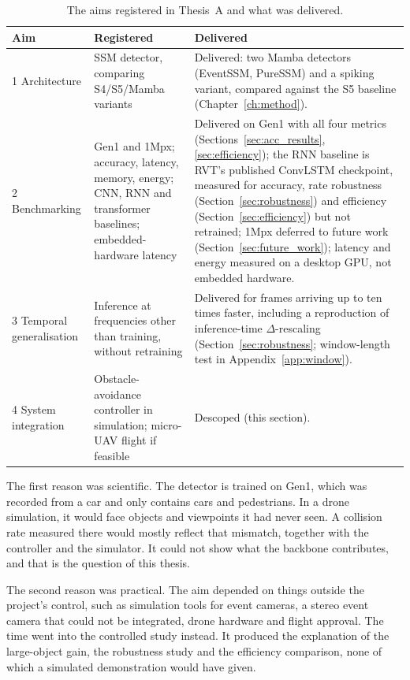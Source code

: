 \documentclass[11pt, a4paper]{report}
\begin{document}
\begin{table}[htbp]
\centering
\small
\caption[Thesis A aims against what was delivered]{The aims registered in Thesis~A and what was delivered.}
\label{tab:aims}
\begin{tabularx}{\textwidth}{@{}l>{\raggedright\arraybackslash}X>{\raggedright\arraybackslash}X@{}}
\toprule
\textbf{Aim} & \textbf{Registered} & \textbf{Delivered} \\
\midrule
1 Architecture & SSM detector, comparing S4/S5/Mamba variants &
  Delivered: two Mamba detectors (EventSSM, PureSSM) and a spiking variant, compared against the S5
  baseline (Chapter~\ref{ch:method}). \\
2 Benchmarking & Gen1 and 1Mpx; accuracy, latency, memory, energy; CNN, RNN and transformer baselines;
  embedded-hardware latency &
  Delivered on Gen1 with all four metrics (Sections~\ref{sec:acc_results}, \ref{sec:efficiency}); the
  RNN baseline is RVT's published ConvLSTM checkpoint, measured for accuracy, rate robustness
  (Section~\ref{sec:robustness}) and efficiency (Section~\ref{sec:efficiency}) but not retrained;
  1Mpx deferred to future work (Section~\ref{sec:future_work}); latency and energy measured on a
  desktop GPU, not embedded hardware. \\
3 Temporal generalisation & Inference at frequencies other than training, without retraining &
  Delivered for frames arriving up to ten times faster, including a reproduction of inference-time
  $\Delta$-rescaling (Section~\ref{sec:robustness}; window-length test in Appendix~\ref{app:window}). \\
4 System integration & Obstacle-avoidance controller in simulation; micro-UAV flight if feasible &
  Descoped (this section). \\
\bottomrule
\end{tabularx}
\end{table}

The first reason was scientific. The detector is trained on Gen1, which was recorded from a car and only
contains cars and pedestrians. In a drone simulation, it would face objects and viewpoints it had never
seen. A collision rate measured there would mostly reflect that mismatch, together with the controller and
the simulator. It could not show what the backbone contributes, and that is the question of this thesis.

The second reason was practical. The aim depended on things outside the project's control, such as simulation tools
for event cameras, a stereo event camera that could not be integrated, drone hardware and flight approval. The time went into the controlled study instead. It produced the explanation of the large-object gain, the
robustness study and the efficiency comparison, none of which a simulated demonstration would have given.
\end{document}
